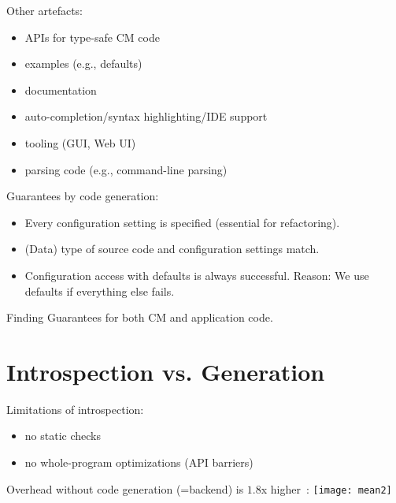 \begin{frame}
	Other artefacts:

	\begin{itemize}
	\item APIs for type-safe CM code
	\item examples (e.g., defaults)
	\item documentation
	\item auto-completion/syntax highlighting/IDE support
	\item tooling (GUI, Web UI)
	\item parsing code (e.g., command-line parsing)
	\end{itemize}
\end{frame}

\begin{frame}
	Guarantees by code generation:

	\begin{itemize}
	\item Every configuration setting is specified (essential for refactoring).
	\item (Data) type of source code and configuration settings match.
	\item Configuration access with defaults is always successful.
	Reason: We use defaults if everything else fails.
	\end{itemize}
	\vspace{3em}

	\begin{alertblock}{Finding}
	Guarantees for both CM and application code.
	\end{alertblock}
\end{frame}



\section{Introspection vs. Generation}

\begin{frame}
	Limitations of introspection:
	\begin{itemize}
	\item no static checks
	\item no whole-program optimizations (API barriers)
	\end{itemize}
\end{frame}

\begin{frame}
	Overhead without code generation (=backend) is $1.8$x higher~\cite{raab2015kps}:
	\texttt{[image: mean2]}
\end{frame}

